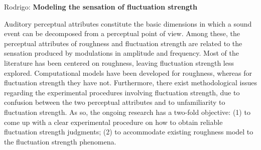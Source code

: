 \documentclass{report}
\begin{document}
Rodrigo: \textbf{Modeling the sensation of fluctuation strength}

Auditory perceptual attributes constitute the basic dimensions in which a sound
event can be decomposed from a perceptual point of view. Among these, the
perceptual attributes of roughness and fluctuation strength are related to the
sensation produced by modulations in amplitude and frequency. Most of the
literature has been centered on roughness, leaving fluctuation strength less
explored. Computational models have been developed for roughness, whereas for
fluctuation strength they have not. Furthermore, there exist methodological
issues regarding the experimental procedures involving fluctuation strength, due
to confusion between the two perceptual attributes and to unfamiliarity to
fluctuation strength. As so, the ongoing research has a two-fold objective: (1)
to come up with a clear experimental procedure on how to obtain reliable
fluctuation strength judgments; (2) to accommodate existing roughness model to
the fluctuation strength phenomena.
\end{document}
